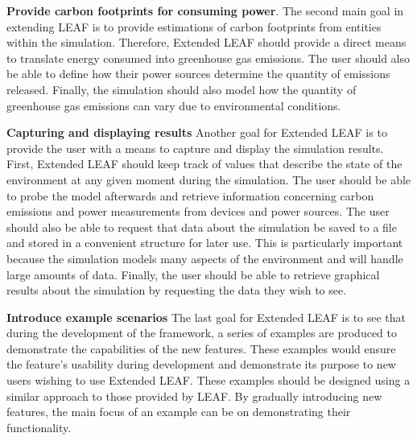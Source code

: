 \documentclass{l4proj}
\begin{document}
\textbf{Provide carbon footprints for consuming power}.
The second main goal in extending LEAF is to provide estimations of carbon footprints from entities within the simulation.
Therefore, Extended LEAF should provide a direct means to translate energy consumed into greenhouse gas emissions.
The user should also be able to define how their power sources determine the quantity of emissions released.
Finally, the simulation should also model how the quantity of greenhouse gas emissions can vary due to environmental conditions.

\textbf{Capturing and displaying results}
Another goal for Extended LEAF is to provide the user with a means to capture and display the simulation results.
First, Extended LEAF should keep track of values that describe the state of the environment at any given moment during the simulation.
The user should be able to probe the model afterwards and retrieve information concerning carbon emissions and power measurements from devices and power sources.
The user should also be able to request that data about the simulation be saved to a file and stored in a convenient structure for later use.
This is particularly important because the simulation models many aspects of the environment and will handle large amounts of data.
Finally, the user should be able to retrieve graphical results about the simulation by requesting the data they wish to see.

\textbf{Introduce example scenarios}
The last goal for Extended LEAF is to see that during the development of the framework, a series of examples are produced to demonstrate the capabilities of the new features.
These examples would ensure the feature's usability during development and demonstrate its purpose to new users wishing to use Extended LEAF.
These examples should be designed using a similar approach to those provided by LEAF. By gradually introducing new features, the main focus of an example can be on demonstrating their functionality.
\end{document}
